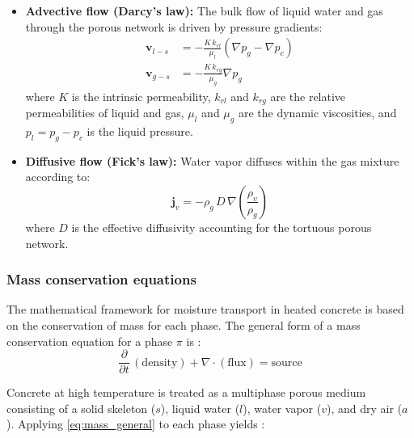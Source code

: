 \begin{itemize}
    \item \textbf{Advective flow (Darcy's law):} The bulk flow of liquid water and gas through the porous network is driven by pressure gradients:
    \begin{align}
        \mathbf{v}_{l-s} &= -\frac{K\, k_{rl}}{\mu_l} \left(\nabla p_g - \nabla p_c\right) \label{eq:darcy_l} \\
        \mathbf{v}_{g-s} &= -\frac{K\, k_{rg}}{\mu_g}\nabla p_g \label{eq:darcy_g}
    \end{align}
    where $K$ is the intrinsic permeability, $k_{rl}$ and $k_{rg}$ are the relative permeabilities of liquid and gas, $\mu_l$ and $\mu_g$ are the dynamic viscosities, and $p_l = p_g - p_c$ is the liquid pressure.
    
    \item \textbf{Diffusive flow (Fick's law):} Water vapor diffuses within the gas mixture according to:
    \begin{equation}
        \mathbf{j}_v = -\rho_g\, D\, \nabla \left(\frac{\rho_v}{\rho_g}\right) \label{eq:fick}
    \end{equation}
    where $D$ is the effective diffusivity accounting for the tortuous porous network.
\end{itemize}

\subsubsection{Mass conservation equations}

The mathematical framework for moisture transport in heated concrete is based on the conservation of mass for each phase. The general form of a mass conservation equation for a phase $\pi$ is \cite{dauti2018}:
\begin{equation}
    \frac{\partial}{\partial t}\,(\text{density}) + \nabla\cdot(\text{flux}) = \text{source} \label{eq:mass_general}
\end{equation}

Concrete at high temperature is treated as a multiphase porous medium consisting of a solid skeleton ($s$), liquid water ($l$), water vapor ($v$), and dry air ($a$). Applying \cref{eq:mass_general} to each phase yields \cite{dauti2018}:

